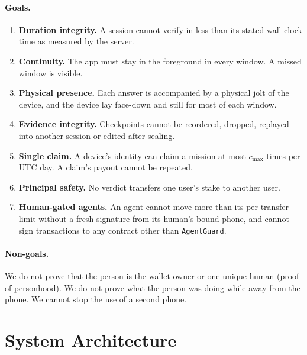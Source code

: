 \documentclass[10pt]{article}
\newcommand{\code}[1]{\texttt{\small #1}}
\begin{document}
\paragraph{Goals.}
\begin{enumerate}[label=\textbf{G\arabic*}]
\item \textbf{Duration integrity.} A session cannot verify in less than its stated wall-clock time as measured by the
server.
\item \textbf{Continuity.} The app must stay in the foreground in every window. A missed window is visible.
\item \textbf{Physical presence.} Each answer is accompanied by a physical jolt of the device, and the device lay
face-down and still for most of each window.
\item \textbf{Evidence integrity.} Checkpoints cannot be reordered, dropped, replayed into another session or edited
after sealing.
\item \textbf{Single claim.} A device's identity can claim a mission at most $c_{\max}$ times per UTC day. A claim's
payout cannot be repeated.
\item \textbf{Principal safety.} No verdict transfers one user's stake to another user.
\item \textbf{Human-gated agents.} An agent cannot move more than its per-transfer limit without a fresh signature from
its human's bound phone, and cannot sign transactions to any contract other than \code{AgentGuard}.
\end{enumerate}

\paragraph{Non-goals.} We do not prove that the person is the wallet owner or one unique human (proof of personhood).
We do not prove what the person was doing while away from the phone. We cannot stop the use of a second phone.

\section{System Architecture}\label{sec:arch}
\end{document}
